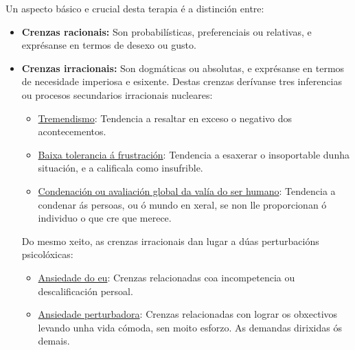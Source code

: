 \documentclass[a4paper,11pt]{article}
\begin{document}
Un aspecto básico e crucial desta terapia é a distinción entre:
\begin{itemize}
	\item \textbf{Crenzas racionais:} Son probabilísticas, preferenciais ou relativas, e exprésanse 
	en termos de desexo ou gusto. 
	\item \textbf{Crenzas irracionais:} Son dogmáticas ou absolutas, e exprésanse en termos de 
	necesidade imperiosa e esixente. Destas crenzas derívanse tres inferencias ou procesos 
	secundarios irracionais nucleares:
	\begin{itemize}
		\item \underline{Tremendismo}: Tendencia a resaltar en exceso o negativo dos acontecementos.
		\item \underline{Baixa tolerancia á frustración}: Tendencia a esaxerar o insoportable dunha 
		situación, e a calificala como insufrible.
		\item \underline{Condenación ou avaliación global da valía do ser humano}: Tendencia a 
		condenar ás persoas, ou ó mundo en xeral, se non lle proporcionan ó individuo o que cre que 
		merece.
	\end{itemize}
	
	Do mesmo xeito, as crenzas irracionais dan lugar a dúas perturbacións psicolóxicas:
	\begin{itemize}
		\item \underline{Ansiedade do eu}: Crenzas relacionadas coa incompetencia ou descalificación 
		persoal.
		\item \underline{Ansiedade perturbadora}: Crenzas relacionadas con lograr os obxectivos 
		levando unha vida cómoda, sen moito esforzo. As demandas dirixidas ós demais.
	\end{itemize}
\end{itemize}
\end{document}
